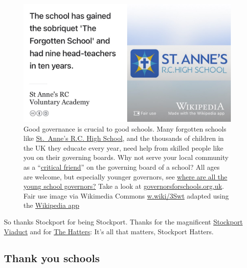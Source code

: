 \documentclass[
]{book}
\begin{document}
\begin{figure}

{\centering \includegraphics[width=1\linewidth]{images/st-annes-rc-high-school} 

}

\caption{Good governance is crucial to good schools. Many forgotten schools like \href{https://en.wikipedia.org/wiki/St_Anne\%27s_RC_Voluntary_Academy}{St.~Anne's R.C. High School}, and the thousands of children in the UK they educate every year, need help from skilled people like you on their governing boards. Why not serve your local community as a ``\href{https://en.wikipedia.org/wiki/Critical_friend}{critical friend}'' on the governing board of a school? All ages are welcome, but especially younger governors, see \href{https://www.theguardian.com/teacher-network/2015/mar/11/young-people-school-governors}{where are all the young school governors?} \citep{youngovernors} Take a look at \href{https://governorsforschools.org.uk/}{governorsforschools.org.uk}. Fair use image via Wikimedia Commons \href{https://w.wiki/3Swt}{w.wiki/3Swt} adapted using the \href{https://apps.apple.com/us/app/wikipedia/id324715238}{Wikipedia app}}\label{fig:st-annes-fig}
\end{figure}



So thanks Stockport for being Stockport. Thanks for the magnificent \href{https://en.wikipedia.org/wiki/Stockport_Viaduct}{Stockport Viaduct} and for \href{https://en.wikipedia.org/wiki/Stockport_County_F.C.}{The Hatters}: It's all that matters, Stockport Hatters. 🙏

\hypertarget{schools}{%
\subsection{Thank you schools}\label{schools}}
\end{document}
